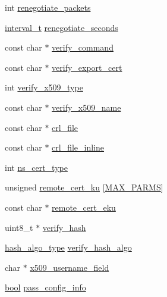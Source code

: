 \begin{DoxyCompactItemize}
\item 
int \hyperlink{structtls__options_acffc29afc34414d015cee78e2b238ac6}{renegotiate\+\_\+packets}
\item 
\hyperlink{common_8h_a3d8621f960ada51a5ad9ff181730481a}{interval\+\_\+t} \hyperlink{structtls__options_a5884f8429da3da45931f71e4c8c2aca5}{renegotiate\+\_\+seconds}
\item 
const char $\ast$ \hyperlink{structtls__options_a7c8367192cd2005afa4971a0468b31bf}{verify\+\_\+command}
\item 
const char $\ast$ \hyperlink{structtls__options_a565a61d1fe9209be7fe0c41940a46126}{verify\+\_\+export\+\_\+cert}
\item 
int \hyperlink{structtls__options_a9dec6251d97917d104baa69ddf27a5b3}{verify\+\_\+x509\+\_\+type}
\item 
const char $\ast$ \hyperlink{structtls__options_aa2b4275c8e14021d83b15a7e17e939d3}{verify\+\_\+x509\+\_\+name}
\item 
const char $\ast$ \hyperlink{structtls__options_ae03dbf132f7b9a09b54c516361a143da}{crl\+\_\+file}
\item 
const char $\ast$ \hyperlink{structtls__options_a77aa1733303bcdf9d80eeac147483050}{crl\+\_\+file\+\_\+inline}
\item 
int \hyperlink{structtls__options_ad872e320bb7be0b04c535cec5f21195b}{ns\+\_\+cert\+\_\+type}
\item 
unsigned \hyperlink{structtls__options_a3a5c52df12ac9222ea08cec7753b22b5}{remote\+\_\+cert\+\_\+ku} \mbox{[}\hyperlink{options_8h_abc112140dccf35b37370da1791c3d8c3}{M\+A\+X\+\_\+\+P\+A\+R\+M\+S}\mbox{]}
\item 
const char $\ast$ \hyperlink{structtls__options_aefa62cdcb579f4a6bce35311ce9da7a6}{remote\+\_\+cert\+\_\+eku}
\item 
uint8\+\_\+t $\ast$ \hyperlink{structtls__options_ac131aba077a096b47e8b5c32f5da0878}{verify\+\_\+hash}
\item 
\hyperlink{crypto__backend_8h_a1bdec30a85e44df9ee6c6ad815bccb00}{hash\+\_\+algo\+\_\+type} \hyperlink{structtls__options_ada951f04756086139587ecfb2f407b52}{verify\+\_\+hash\+\_\+algo}
\item 
char $\ast$ \hyperlink{structtls__options_a647ce1910e6a305011105ef5209c4969}{x509\+\_\+username\+\_\+field}
\item 
\hyperlink{automatic_8c_abb452686968e48b67397da5f97445f5b}{bool} \hyperlink{structtls__options_a18cd1b8c38bba816f1265d4a2f271930}{pass\+\_\+config\+\_\+info}
\item 

\end{DoxyCompactItemize}
